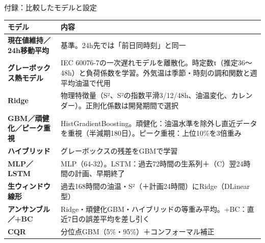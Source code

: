 \documentclass[aspectratio=169,10pt]{beamer}
\begin{document}
\begin{frame}{付録：比較したモデルと設定}
  \scriptsize
  \renewcommand{\arraystretch}{1.2}
  \begin{tabularx}{\textwidth}{>{\bfseries}p{3.2cm} X}
    \toprule
    モデル & 内容 \\
    \midrule
    現在値維持／24h移動平均 & 基準。24h先では「前日同時刻」と同一 \\
    グレーボックス熱モデル & IEC 60076-7の一次遅れモデルを離散化。時定数τ（推定36〜48h）と負荷係数を学習。外気温は季節・時刻の調和関数と週平均油温で代用 \\
    Ridge & 物理特徴量（S²、S²の指数平滑3/12/48h、油温変化、カレンダー）。正則化係数は開発期間で選択 \\
    GBM／頑健化／ピーク重視 & HistGradientBoosting。頑健化：油温水準を除外し直近データを重視（半減期180日）。ピーク重視：上位10\%を3倍重み \\
    ハイブリッド & グレーボックスの残差をGBMで学習 \\
    MLP／LSTM & MLP（64-32）。LSTM：過去72時間の生系列＋（C）翌24時間の計画、早期終了 \\
    生ウィンドウ線形 & 過去168時間の油温・S²（＋計画24時間）にRidge（DLinear型） \\
    アンサンブル／+BC & Ridge・頑健化GBM・ハイブリッドの等重み平均。+BC：直近7日の誤差平均を差し引く \\
    CQR & 分位点GBM（5\%・95\%）＋コンフォーマル補正 \\
    \bottomrule
  \end{tabularx}
\end{frame}
\end{document}
